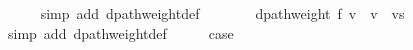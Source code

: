 \begin{isabellebody}
\ \ \ \ \isamarkupfalse%
\ {\isacharparenleft}{\kern0pt}simp\ add{\isacharcolon}{\kern0pt}\ dpath{\isacharunderscore}{\kern0pt}weight{\isacharunderscore}{\kern0pt}def{\isacharparenright}{\kern0pt}\isanewline
\ \ \isamarkupfalse%
\ \isamarkupfalse%
\ {\isachardoublequoteopen}{\isachardot}{\kern0pt}{\isachardot}{\kern0pt}{\isachardot}{\kern0pt}\ {\isacharequal}{\kern0pt}\ dpath{\isacharunderscore}{\kern0pt}weight\ {\isacharquery}{\kern0pt}f\ {\isacharparenleft}{\kern0pt}v\ {\isacharhash}{\kern0pt}\ v{\isacharprime}{\kern0pt}\ {\isacharhash}{\kern0pt}\ vs{\isacharparenright}{\kern0pt}{\isachardoublequoteclose}\isanewline
\ \ \ \ \isamarkupfalse%
\ {\isacharparenleft}{\kern0pt}simp\ add{\isacharcolon}{\kern0pt}\ dpath{\isacharunderscore}{\kern0pt}weight{\isacharunderscore}{\kern0pt}def{\isacharparenright}{\kern0pt}\isanewline
\ \ \isamarkupfalse%
\ \isamarkupfalse%
\ {\isacharquery}{\kern0pt}case\isanewline
\ \ \ \ \isacommand{{\isachardot}{\kern0pt}}\isamarkupfalse%
\isanewline
{}\isamarkupfalse%
%
\endisatagproof
{\isafoldproof}%
%
\isadelimproof
\isanewline
%
\endisadelimproof
%
\isadelimtheory
\isanewline
%
\endisadelimtheory
%
\isatagtheory
{}\isamarkupfalse%
%
\endisatagtheory
{\isafoldtheory}%
%
\isadelimtheory
%
\endisadelimtheory
%
\end{isabellebody}%
\endinput
